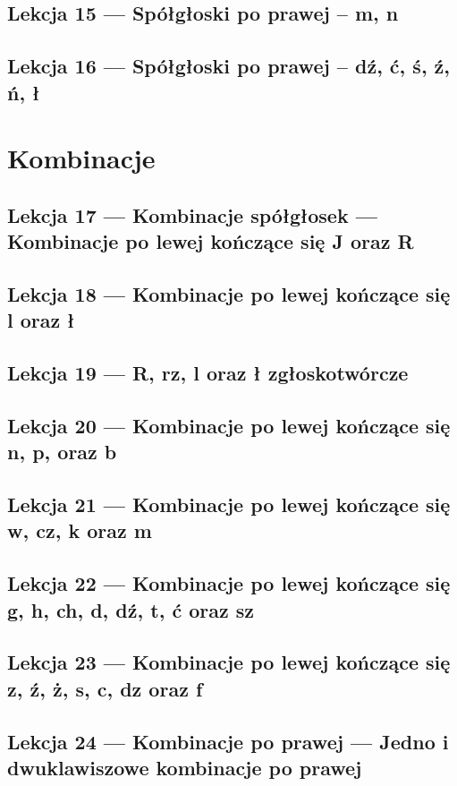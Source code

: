 \documentclass[12p, oneside]{book}
\begin{document}
\section{Lekcja 15 --- Spółgłoski po prawej -- m, n}
\newpage
\section{Lekcja 16 --- Spółgłoski po prawej -- dź, ć, ś, ź, ń, ł}
\newpage

\chapter{Kombinacje}
\section{Lekcja 17 --- Kombinacje spółgłosek --- Kombinacje po lewej kończące się J oraz R}
\newpage
\section{Lekcja 18 --- Kombinacje po lewej kończące się l oraz ł}
\newpage
\section{Lekcja 19 --- R, rz, l oraz ł zgłoskotwórcze}
\newpage
\section{Lekcja 20 --- Kombinacje po lewej kończące się n, p, oraz b}
\newpage
\section{Lekcja 21 --- Kombinacje po lewej kończące się w, cz, k oraz m}
\newpage
\section{Lekcja 22 --- Kombinacje po lewej kończące się g, h, ch, d, dź, t, ć oraz sz}
\newpage
\section{Lekcja 23 --- Kombinacje po lewej kończące się z, ź, ż, s, c, dz oraz f}
\newpage
\section{Lekcja 24 --- Kombinacje po prawej --- Jedno i dwuklawiszowe kombinacje po prawej}
\newpage
\end{document}
